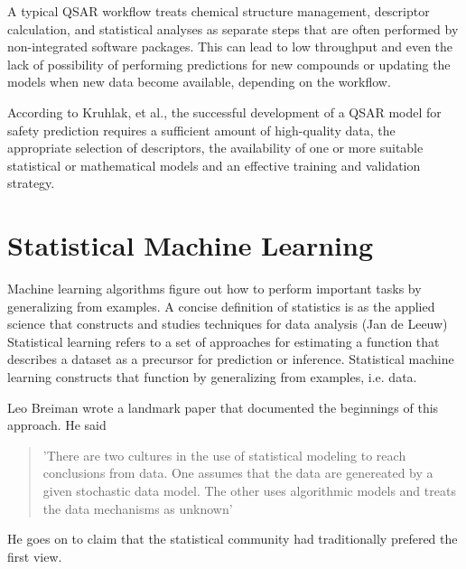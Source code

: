 A typical QSAR workflow treats chemical structure management, descriptor calculation, and statistical analyses as separate steps that are often performed by non-integrated software packages. This can lead to low throughput and even the lack of possibility of performing predictions for new compounds or updating the models when new data become available, depending on the workflow.

According to Kruhlak, et al., the successful development of a QSAR model for safety prediction requires a sufficient amount of high-quality data, the appropriate selection of descriptors, the availability of one or more suitable statistical or mathematical models and an effective training and validation strategy.
\cite{Kruhlak2012}



\section{Statistical Machine Learning}

Machine learning algorithms figure out how to perform important tasks by generalizing from examples. A concise definition of statistics is as the applied science that constructs and studies techniques for data analysis (Jan de Leeuw) Statistical learning refers to a set of approaches for estimating a function that describes a dataset as a precursor for prediction or inference. \cite{James2013} Statistical machine learning constructs that function by generalizing from examples, i.e. data.

Leo Breiman wrote a landmark paper that documented the beginnings of this approach. He said 
\begin{quote}
'There are two cultures in the use of statistical modeling to reach conclusions from data. One assumes that the data are genereated by a given stochastic data model. The other uses algorithmic models and treats the data mechanisms as unknown' \cite{Breiman2001}
\end{quote} He goes on to claim that the statistical community had traditionally prefered the first view.

